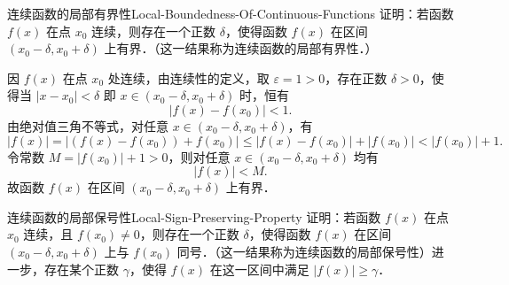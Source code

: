 \begin{problem}{连续函数的局部有界性}{Local-Boundedness-Of-Continuous-Functions}
    证明：若函数 $f(x)$ 在点 $x_0$ 连续，则存在一个正数 $\delta$，使得函数 $f(x)$ 在区间 $(x_0 - \delta, x_0 + \delta)$ 上有界．（这一结果称为连续函数的局部有界性．）
\end{problem}

\begin{myproof}
    因 $f(x)$ 在点 $x_0$ 处连续，由连续性的定义，取 $\varepsilon = 1 > 0$，存在正数 $\delta > 0$，使得当 $|x - x_0| < \delta$ 即 $x \in (x_0 - \delta, x_0 + \delta)$ 时，恒有
    \begin{equation}
        |f(x) - f(x_0)| < 1.
    \end{equation}
    由绝对值三角不等式，对任意 $x \in (x_0 - \delta, x_0 + \delta)$，有
    \begin{equation}
        |f(x)| = |(f(x) - f(x_0)) + f(x_0)| \leqslant |f(x) - f(x_0)| + |f(x_0)| < |f(x_0)| + 1.
    \end{equation}
    令常数 $M = |f(x_0)| + 1 > 0$，则对任意 $x \in (x_0 - \delta, x_0 + \delta)$ 均有
    \begin{equation}
        |f(x)| < M.
    \end{equation}
    故函数 $f(x)$ 在区间 $(x_0 - \delta, x_0 + \delta)$ 上有界．
\end{myproof}

\begin{problem}{连续函数的局部保号性}{Local-Sign-Preserving-Property}
    证明：若函数 $f(x)$ 在点 $x_0$ 连续，且 $f(x_0) \neq 0$，则存在一个正数 $\delta$，使得函数 $f(x)$ 在区间 $(x_0 - \delta, x_0 + \delta)$ 上与 $f(x_0)$ 同号．（这一结果称为连续函数的局部保号性）进一步，存在某个正数 $\gamma$，使得 $f(x)$ 在这一区间中满足 $|f(x)| \geqslant \gamma$．
\end{problem}

